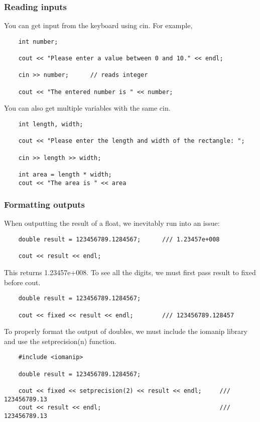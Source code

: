 \documentclass[]{article}
\begin{document}
\subsubsection{Reading inputs}

You can get input from the keyboard using cin. For example,

\begin{lstlisting}
	int number;
	
	cout << "Please enter a value between 0 and 10." << endl;
	
	cin >> number;		// reads integer
	
	cout << "The entered number is " << number;
\end{lstlisting}
\bigbreak

You can also get multiple variables with the same cin.

\begin{lstlisting}
	int length, width;
	
	cout << "Please enter the length and width of the rectangle: ";
	
	cin >> length >> width;
	
	int area = length * width;
	cout << "The area is " << area
\end{lstlisting}
\bigbreak

\subsubsection{Formatting outputs}

When outputting the result of a float, we inevitably run into an issue:

\begin{lstlisting}
	double result = 123456789.1284567;		/// 1.23457e+008
	
	cout << result << endl;
\end{lstlisting}
\bigbreak

This returns 1.23457e+008. To see all the digits, we must first pass result to fixed before cout.
\begin{lstlisting}
	double result = 123456789.1284567;
	
	cout << fixed << result << endl;		/// 123456789.128457
\end{lstlisting}
\bigbreak

To properly format the output of doubles, we must include the iomanip library and use the setprecision(n) function.

\begin{lstlisting}
	#include <iomanip>
	
	double result = 123456789.1284567;
	
	cout << fixed << setprecision(2) << result << endl;		/// 123456789.13
	cout << result << endl;									/// 123456789.13
\end{lstlisting}
\bigbreak
\end{document}
